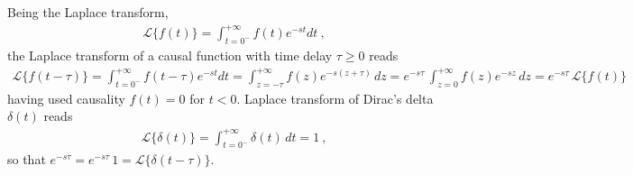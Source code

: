\documentclass[letterpaper,10pt,english]{jupyterBook}
\begin{document}
\sphinxAtStartPar
Being the Laplace transform,
\begin{equation*}
\begin{split}\mathscr{L}\{ f(t) \} = \int_{t=0^-}^{+\infty} f(t) e^{-st} dt \ ,\end{split}
\end{equation*}
\sphinxAtStartPar
the Laplace transform of a causal function with time delay \(\tau \ge 0\) reads
\begin{equation*}
\begin{split}\mathscr{L}\{ f(t-\tau) \} = \int_{t=0^-}^{+\infty} f(t-\tau) e^{-st} dt = \int_{z = - \tau}^{+\infty} f(z) e^{-s(z+\tau)} \, dz = e^{-s\tau} \, \int_{z = 0}^{+\infty} f(z) e^{-s z} \, dz = e^{-s \tau} \, \mathscr{L}\{ f(t) \}\end{split}
\end{equation*}
\sphinxAtStartPar
having used causality \(f(t) = 0\) for \(t < 0\). Laplace transform of Dirac’s delta \(\delta(t)\) reads
\begin{equation*}
\begin{split}\mathscr{L}\{ \delta(t) \} = \int_{t=0^-}^{+\infty} \delta(t) \, dt = 1 \ ,\end{split}
\end{equation*}
\sphinxAtStartPar
so that \(e^{-s \tau} = e^{- s \tau} \, 1 = \mathscr{L}\{ \delta(t-\tau) \}\).
\end{document}
